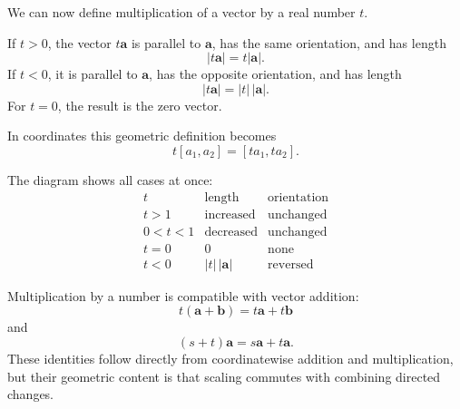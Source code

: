 We can now define multiplication of a vector by a real number $t$.

If $t>0$, the vector $t\mathbf a$ is parallel to $\mathbf a$, has the same
orientation, and has length
\[
|t\mathbf a|=t|\mathbf a|.
\]
If $t<0$, it is parallel to $\mathbf a$, has the opposite orientation, and has
length
\[
|t\mathbf a|=|t|\,|\mathbf a|.
\]
For $t=0$, the result is the zero vector.

In coordinates this geometric definition becomes
\[
\boxed{
t[a_1,a_2]=[ta_1,ta_2]
}.
\]

\begin{center}
\end{center}

The diagram shows all cases at once:
\[
\begin{array}{c|c|c}
 t & \text{length} & \text{orientation}\\
 \hline
 t>1 & \text{increased} & \text{unchanged}\\
 0<t<1 & \text{decreased} & \text{unchanged}\\
 t=0 & 0 & \text{none}\\
 t<0 & |t|\,|\mathbf a| & \text{reversed}
\end{array}
\]

Multiplication by a number is compatible with vector addition:
\[
\boxed{
t(\mathbf a+\mathbf b)=t\mathbf a+t\mathbf b
}
\]
and
\[
\boxed{
(s+t)\mathbf a=s\mathbf a+t\mathbf a
}.
\]
These identities follow directly from coordinatewise addition and
multiplication, but their geometric content is that scaling commutes with
combining directed changes.
